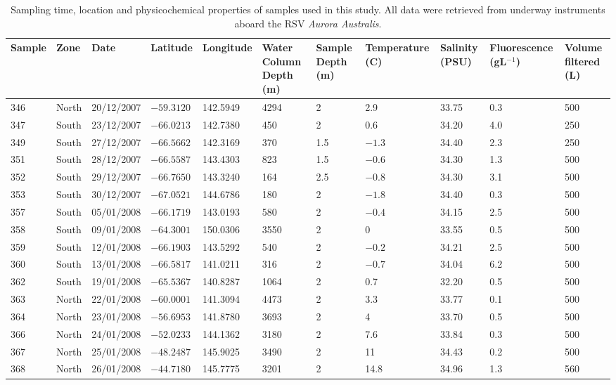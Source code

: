 \begin{sidewaystable}
\sffamily
\caption[Details of samples used in Polar Front study]{\sffamily{}Sampling time, location and physicochemical properties of samples used in this study.
All data were retrieved from underway instruments aboard the RSV \textit{Aurora Australis}.}
\label{tab:samplelist}
\smallskip
\begin{tabularx}{\textheight}{lllllXXXXXX}
\toprule
\textbf{Sample} & \textbf{Zone} & \textbf{Date} & \textbf{Latitude} & \textbf{Longitude} & \textbf{Water \linebreak Column \linebreak Depth (m)} & \textbf{Sample Depth (m)} & \textbf{Temperature (\textdegree{}C)} & \textbf{Salinity (PSU)} & \textbf{Fluorescence \linebreak (\textmu{}gL$^{-1}$)} & \textbf{Volume \linebreak filtered (L)}\\
\midrule

346 & North & 20/12/2007 & $-59.3120$ & 142.5949 & 4294 & 2 & 2.9 & 33.75 & 0.3 & 500\\
347 & South & 23/12/2007 & $-66.0213$ & 142.7380 & 450 & 2 & 0.6 & 34.20 & 4.0 & 250\\
349 & South & 27/12/2007 & $-66.5662$ & 142.3169 & 370 & 1.5 & $-1.3$ & 34.40 & 2.3 & 250\\
351 & South & 28/12/2007 & $-66.5587$ & 143.4303 & 823 & 1.5 & $-0.6$ & 34.30 & 1.3 & 500\\
352 & South & 29/12/2007 & $-66.7650$ & 143.3240 & 164 & 2.5 & $-0.8$ & 34.30 & 3.1 & 500\\
353 & South & 30/12/2007 & $-67.0521$ & 144.6786 & 180 & 2 & $-1.8$ & 34.40 & 0.3 & 500\\
357 & South & 05/01/2008 & $-66.1719$ & 143.0193 & 580 & 2 & $-0.4$ & 34.15 & 2.5 & 500\\
358 & South & 09/01/2008 & $-64.3001$ & 150.0306 & 3550 & 2 & 0 & 33.55 & 0.5 & 500\\
359 & South & 12/01/2008 & $-66.1903$ & 143.5292 & 540 & 2 & $-0.2$ & 34.21 & 2.5 & 500\\
360 & South & 13/01/2008 & $-66.5817$ & 141.0211 & 316 & 2 & $-0.7$ & 34.04 & 6.2 & 500\\
362 & South & 19/01/2008 & $-65.5367$ & 140.8287 & 1064 & 2 & 0.7 & 32.20 & 0.5 & 500\\
363 & North & 22/01/2008 & $-60.0001$ & 141.3094 & 4473 & 2 & 3.3 & 33.77 & 0.1 & 500\\
364 & North & 23/01/2008 & $-56.6953$ & 141.8780 & 3693 & 2 & 4 & 33.70 & 0.5 & 500\\
366 & North & 24/01/2008 & $-52.0233$ & 144.1362 & 3180 & 2 & 7.6 & 33.84 & 0.3 & 500\\
367 & North & 25/01/2008 & $-48.2487$ & 145.9025 & 3490 & 2 & 11 & 34.43 & 0.2 & 500\\
368 & North & 26/01/2008 & $-44.7180$ & 145.7775 & 3201 & 2 & 14.8 & 34.96 & 1.3 & 560\\

\bottomrule
\end{tabularx}
\end{sidewaystable}
